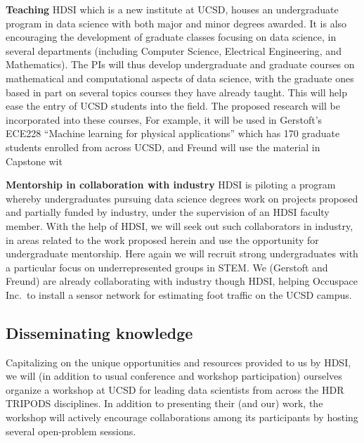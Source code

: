 {\bf Teaching}   HDSI which is a new institute at UCSD, houses an undergraduate program in data science with both major and minor degrees awarded.  It is also encouraging the development of graduate classes focusing on data science, in several departments (including Computer Science, Electrical Engineering, and Mathematics). The PIs will thus develop undergraduate and graduate courses on mathematical and computational aspects of data science, with the graduate ones based in part on several topics courses
they have already taught. This will help ease the entry of UCSD  students into the field. The proposed research will be incorporated into these courses, For example, it will be used in Gerstoft's ECE228 ``Machine learning for physical applications'' which has 170 graduate students enrolled from across UCSD, and Freund will use the material in Capstone wit

{\bf Mentorship in collaboration with industry} HDSI is piloting a program whereby undergraduates pursuing data science degrees work on projects proposed and partially funded by industry, under the supervision of an HDSI faculty member. With the help of HDSI, we will seek out such collaborators in industry, in areas related to the work proposed herein and use the opportunity for undergraduate mentorship. Here again we will recruit strong undergraduates with a particular focus on underrepresented groups in STEM. We (Gerstoft and Freund) are already collaborating with industry though HDSI, helping Occuspace Inc.\ to install a sensor network for estimating foot traffic on the UCSD campus.

\subsection*{Disseminating knowledge}
Capitalizing on the unique opportunities and resources provided to us by HDSI, we will (in addition to usual conference and workshop participation) ourselves organize a workshop at UCSD for leading data scientists from across the HDR TRIPODS disciplines. In addition to presenting their (and our) work, the workshop will actively encourage collaborations among its participants by hosting several open-problem sessions.